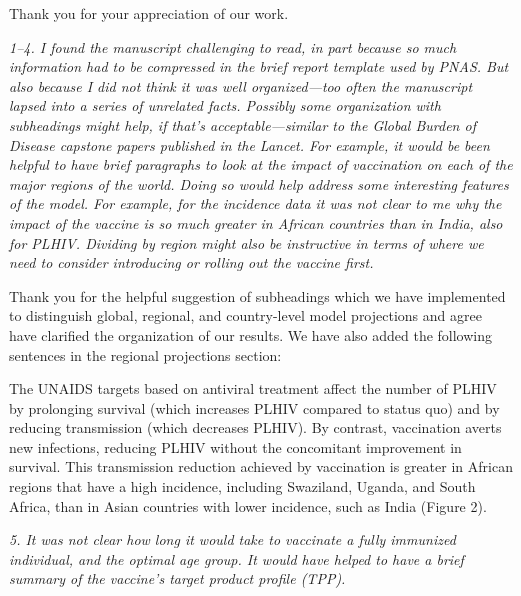 \documentclass[12pt]{jpmletter}
\newenvironment{original}{\it}{}
\begin{document}
\begin{letter}{}
    Thank you for your appreciation of our work.

    \begin{original}
      1–4. I found the manuscript challenging to read, in part
      because so much information had to be compressed in the brief
      report template used by PNAS. But also because I did not think
      it was well organized—too often the manuscript lapsed into a
      series of unrelated facts. Possibly some organization with
      subheadings might help, if that's acceptable—similar to the
      Global Burden of Disease capstone papers published in the
      Lancet. For example, it would be been helpful to have brief
      paragraphs to look at the impact of vaccination on each of the
      major regions of the world. Doing so would help address some
      interesting features of the model. For example, for the
      incidence data it was not clear to me why the impact of the
      vaccine is so much greater in African countries than in India,
      also for PLHIV. Dividing by region might also be instructive in
      terms of where we need to consider introducing or rolling out
      the vaccine first.
    \end{original}
    
    Thank you for the helpful suggestion of subheadings which we have
    implemented to distinguish global, regional, and country-level
    model projections and agree have clarified the organization of our
    results. We have also added the following sentences in the
    regional projections section:
    \begin{quoting}
      The UNAIDS targets based on antiviral treatment affect the
      number of PLHIV by prolonging survival (which increases PLHIV
      compared to status quo) and by reducing transmission (which
      decreases PLHIV). By contrast, vaccination averts new
      infections, reducing PLHIV without the concomitant improvement
      in survival. This transmission reduction achieved by vaccination
      is greater in African regions that have a high incidence,
      including Swaziland, Uganda, and South Africa, than in Asian
      countries with lower incidence, such as India (Figure 2).
    \end{quoting}
    
    \begin{original}
      5. It was not clear how long it would take to vaccinate
      a fully immunized individual, and the optimal age group. It
      would have helped to have a brief summary of the vaccine's
      target product profile (TPP).
    \end{original}
    

\end{letter}
\end{document}
